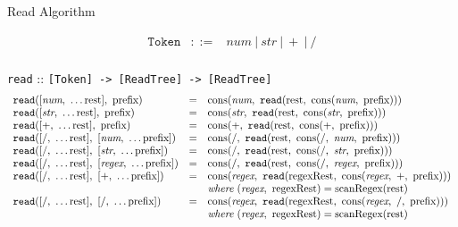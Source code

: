 \documentclass[preprint,10pt]{sigplanconf}
\begin{document}
\begin{displayfigure*}{Read Algorithm}
  
\[
\begin{array}{rcl}
  \texttt{Token} &::=& \textit{num}~|~\textit{str}~|~+~|~/ \\
\end{array}
\]

  \texttt{read} :: \verb![Token] -> [ReadTree] -> [ReadTree]!
\[
  \begin{array}{lcl}
    \texttt{read}([\textit{num},~\ldots \textrm{rest}],~\textrm{prefix})
    &=&
    \textrm{cons}(\textit{num},~
      \texttt{read}(\textrm{rest},~
        \textrm{cons}(\textit{num},~\textrm{prefix}) 
      )
    )
    \\
    \texttt{read}([\textit{str},~\ldots \textrm{rest}],~\textrm{prefix})
    &=&
    \textrm{cons}(\textit{str},~
      \texttt{read}(\textrm{rest},~
        \textrm{cons}(\textit{str},~\textrm{prefix})
      )  
    )
    
    
    \\
    \texttt{read}([+,~\ldots \textrm{rest}],~\textrm{prefix})
    &=&
    \textrm{cons}(+,~
      \texttt{read}(\textrm{rest},~
        \textrm{cons}(+,~\textrm{prefix})
      )
    ) 
    \\
    \texttt{read}([/,~\ldots \textrm{rest}],~[\textit{num},~\ldots\textrm{prefix}])
    &=&
    \textrm{cons}(/,~
      \texttt{read}(\textrm{rest},~
        \textrm{cons}(/,~\textit{num},~\textrm{prefix}) 
      )
    )
    \\
    \texttt{read}([/,~\ldots \textrm{rest}],~[\textit{str},~\ldots\textrm{prefix}])
    &=&
    \textrm{cons}(/,~
      \texttt{read}(\textrm{rest},~
        \textrm{cons}(/,~\textit{str},~\textrm{prefix}) 
      )
    )
    \\
    \texttt{read}([/,~\ldots \textrm{rest}],~[\textit{regex},~\ldots\textrm{prefix}])
    &=&
    \textrm{cons}(/,~
      \texttt{read}(\textrm{rest},~
        \textrm{cons}(/,~\textit{regex},~\textrm{prefix}) 
      )
    )
    \\
    \texttt{read}([/,~\ldots \textrm{rest}],~[+,~\ldots\textrm{prefix}])
    &=&
    \textrm{cons}(\textit{regex},~
      \texttt{read}(\textrm{regexRest},~
        \textrm{cons}(\textit{regex},~+,~\textrm{prefix}) 
      )
    )
    \\
    && \textit{where}~(\textit{regex},~\textrm{regexRest}) = 
    \textrm{scanRegex}(\textrm{rest})
    \\
    \texttt{read}([/,~\ldots \textrm{rest}],~[/,~\ldots\textrm{prefix}])
    &=&
    \textrm{cons}(\textit{regex},~
      \texttt{read}(\textrm{regexRest},~
        \textrm{cons}(\textit{regex},~/,~\textrm{prefix}) 
      )
    )
    \\
    && \textit{where}~(\textit{regex},~\textrm{regexRest}) = 
    \textrm{scanRegex}(\textrm{rest})
  \end{array}
\]
\end{displayfigure*}
\end{document}

